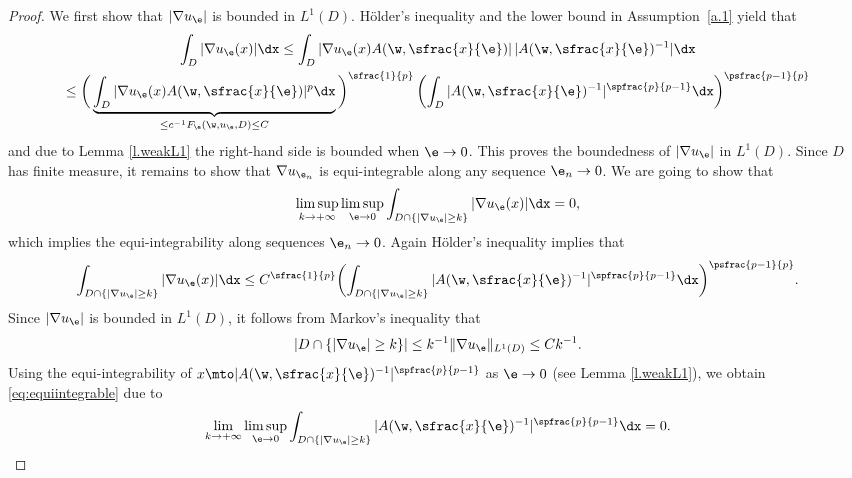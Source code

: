 \begin{proof}
We first show that $|\nabla u_{\e}|$ is bounded in $L^1(D)$. Hölder's inequality and the lower bound in Assumption~\ref{a.1} yield that
\begin{multline}\label{eq:energy_estimate}
\int_D |\nabla u_{\e}(x)|\dx\leq \int_{D} |\nabla u_{\e}(x)A(\w,\sfrac{x}{\e})|\,|A(\w,\sfrac{x}{\e})^{-1}|\dx
\\
\leq\bigg(\underbrace{\int_D|\nabla u_{\e}(x)A(\w,\sfrac{x}{\e})|^p\dx}_{\leq c^{-1}F_{\e}(\w,u_{\e},D)\leq C}\bigg)^{\sfrac{1}{p}}\left(\int_D|A(\w,\sfrac{x}{\e})^{-1}|^{\spfrac{p}{p-1}}\dx\right)^{\psfrac{p-1}{p}}
\end{multline}
and due to Lemma \ref{l.weakL1} the right-hand side is bounded when $\e\to 0$. This proves the boundedness of $|\nabla u_{\e}|$ in $L^1(D)$. Since $D$ has finite measure, it remains to show that $\nabla u_{\e_n}$ is equi-integrable along any sequence $\e_n\to 0$. We are going to show that
\begin{equation}\label{eq:equiintegrable}
\limsup_{k\to +\infty}\limsup_{\e\to 0}\int_{D\cap\{|\nabla u_{\e}|\geq k\}}|\nabla u_{\e}(x)|\dx=0,
\end{equation}
which implies the equi-integrability along sequences $\e_n\to 0$. Again Hölder's inequality implies that
\begin{equation*}
\int_{D\cap\{|\nabla u_{\e}|\geq k\}}|\nabla u_{\e}(x)|\dx\leq C^{\sfrac{1}{p}} \biggl(\int_{D\cap\{|\nabla u_{\e}|\geq k\}}|A(\w,\sfrac{x}{\e})^{-1}|^{\spfrac{p}{p-1}}\dx\biggr)^{\psfrac{p-1}{p}}.
\end{equation*}
Since $|\nabla u_{\e}|$ is bounded in $L^1(D)$, it follows from Markov's inequality that
\begin{equation*}
|D\cap\{|\nabla u_{\e}|\geq k\}|\leq k^{-1}\|\nabla u_{\e}\|_{L^1(D)}\leq Ck^{-1}.
\end{equation*}
Using the equi-integrability of $x\mto |A(\w,\sfrac{x}{\e})^{-1}|^{\spfrac{p}{p-1}}$ as $\e\to 0$ (see Lemma \ref{l.weakL1}), we obtain \eqref{eq:equiintegrable} due to
\begin{equation*}
\lim_{k\to +\infty}\limsup_{\e\to 0}\int_{D\cap\{|\nabla u_{\e}|\geq k\}}|A(\w,\sfrac{x}{\e})^{-1}|^{\spfrac{p}{p-1}}\dx=0.
\end{equation*}


\end{proof}
